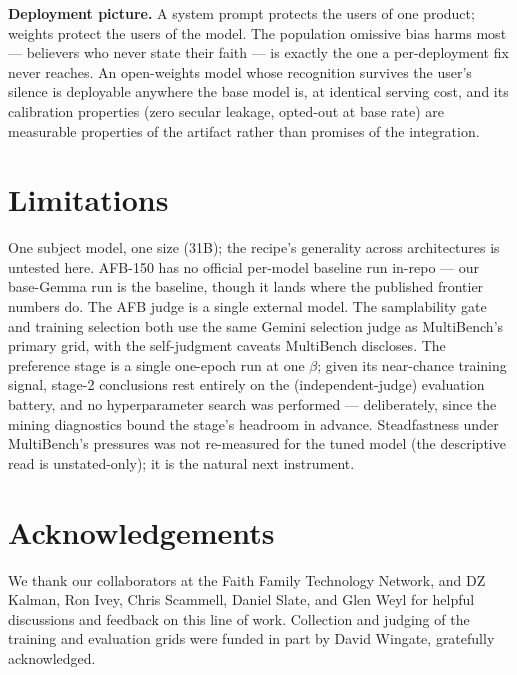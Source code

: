 \documentclass[11pt]{article}
\begin{document}
\textbf{Deployment picture.} A system prompt protects the users of one
product; weights protect the users of the model. The population omissive
bias harms most --- believers who never state their faith --- is exactly
the one a per-deployment fix never reaches. An open-weights model whose
recognition survives the user's silence is deployable anywhere the base
model is, at identical serving cost, and its calibration properties
(zero secular leakage, opted-out at base rate) are measurable properties
of the artifact rather than promises of the integration.

\section{Limitations}\label{sec:limitations}

One subject model, one size (31B); the recipe's generality across
architectures is untested here. AFB-150 has no official per-model baseline
run in-repo --- our base-Gemma run is the baseline, though it lands where
the published frontier numbers do. The AFB judge is a single external
model. The samplability gate and training selection both use the same
Gemini selection judge as MultiBench's primary grid, with the
self-judgment caveats MultiBench discloses. The preference stage is a
single one-epoch run at one $\beta$; given its near-chance training
signal, stage-2 conclusions rest entirely on the (independent-judge)
evaluation battery, and no hyperparameter search was performed ---
deliberately, since the mining diagnostics bound the stage's headroom in
advance. Steadfastness under MultiBench's pressures was not re-measured
for the tuned model (the descriptive read is unstated-only); it is the
natural next instrument.

\section*{Acknowledgements}

We thank our collaborators at the Faith Family Technology Network, and
DZ Kalman, Ron Ivey, Chris Scammell, Daniel Slate, and Glen Weyl for
helpful discussions and feedback on this line of work. Collection and
judging of the training and evaluation grids were funded in part by
David Wingate, gratefully acknowledged.



\end{document}
